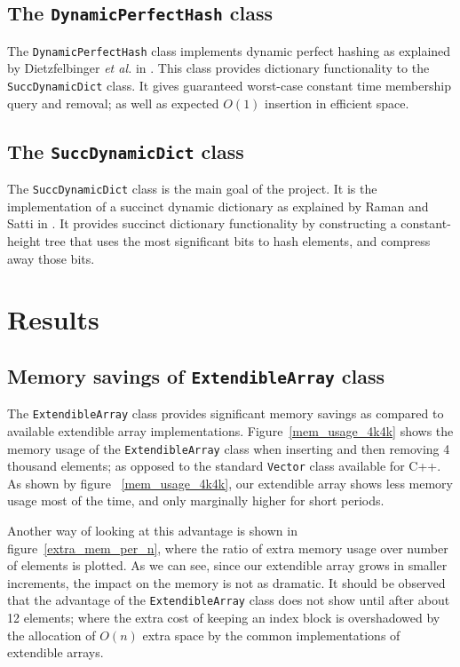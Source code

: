 \documentclass[10pt,a4paper]{article}
\begin{document}
\subsection{The \texttt{DynamicPerfectHash} class}
The \texttt{DynamicPerfectHash} class implements dynamic perfect hashing as explained
by Dietzfelbinger \textit{et al.} in \cite{DM1994}. This class provides dictionary
functionality to the \texttt{SuccDynamicDict} class. It gives guaranteed worst-case 
constant time membership query and removal; as well as expected \(O(1)\) insertion
in efficient space.

\subsection{The \texttt{SuccDynamicDict} class}
The \texttt{SuccDynamicDict} class is the main goal of the project. It is the 
implementation of a succinct dynamic dictionary as explained by Raman and Satti 
in \cite{ramansatti2003}. It provides succinct dictionary functionality by constructing
a constant-height tree that uses the most significant bits to hash elements, and
compress away those bits.

\section {Results}

\subsection{Memory savings of \texttt{ExtendibleArray} class}
The \texttt{ExtendibleArray} class provides significant memory savings as compared 
to available extendible array implementations. Figure~\ref{mem_usage_4k4k} shows the
memory usage of the \texttt{ExtendibleArray} class when inserting and then removing
4 thousand elements; as opposed to the standard \texttt{Vector} class available for C++.
As shown by figure ~\ref{mem_usage_4k4k}, our extendible array shows less memory usage most of the time,
and only marginally higher for short periods. 

Another way of looking at this advantage is shown in figure~\ref{extra_mem_per_n}, 
where the ratio of extra memory usage over number of elements is plotted. As we can see,
since our extendible array grows in smaller increments, the impact on the memory is not
as dramatic. It should be observed that the advantage of the \texttt{ExtendibleArray} 
class does not show until after about 12 elements; where the extra cost of keeping an
index block is overshadowed by the allocation of \(O(n)\) extra space by the common
implementations of extendible arrays.
\end{document}
